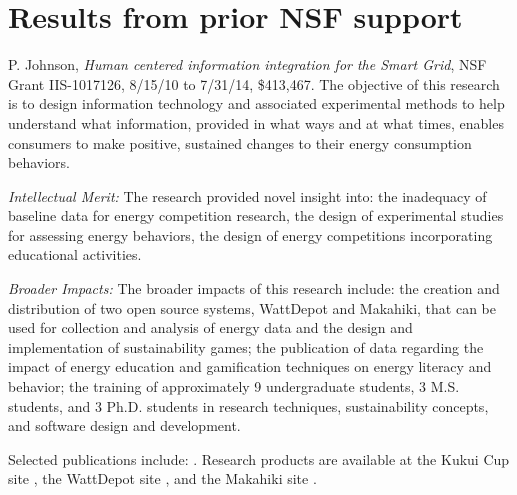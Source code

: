 
\section{Results from prior NSF support}

P. Johnson, {\em Human centered information integration for the Smart Grid}, NSF Grant IIS-1017126, 8/15/10 to 7/31/14, \$413,467. The objective of this research is to design information technology and associated experimental methods to help understand what information, provided in what ways and at what times, enables consumers to make positive, sustained changes to their energy consumption behaviors. 

{\em Intellectual Merit:} The research provided novel insight into: the inadequacy of baseline data for energy competition research, the design of experimental studies for assessing energy behaviors, the design of energy competitions incorporating educational activities. 

{\em Broader Impacts:} The broader impacts of this research include: the creation and distribution of two open source systems, WattDepot and Makahiki, that can be used for collection and analysis of energy data and the design and implementation of sustainability games; the publication of data regarding the impact of energy
education and gamification techniques on energy literacy and behavior; the training of approximately 9 undergraduate students, 3 M.S. students, and 3 Ph.D. students in research techniques, sustainability concepts, and software design and development.

Selected publications include:
  \cite{csdl2-10-05,csdl2-10-07,csdl2-10-08,csdl2-11-02,csdl2-11-03,csdl2-12-06,csdl2-11-07, csdl2-12-12,csdl2-13-10,csdl2-13-05,csdl2-13-03}. Research products are available at the Kukui Cup site \cite{kukuicup}, the WattDepot site \cite{wattdepot}, and the Makahiki site \cite{makahiki}.
  

  
